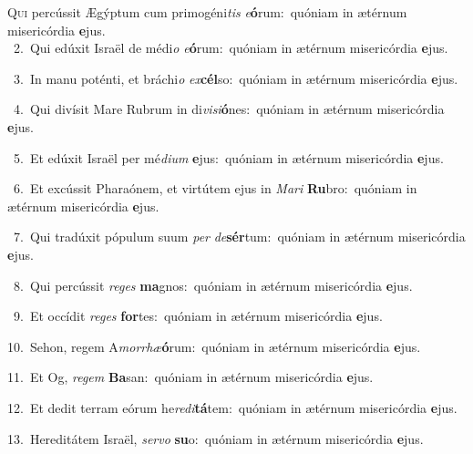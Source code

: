 \lettrine{\initial\textcolor{\initialcolor}{Q}}{ui} percússit Ægýptum cum primogéni\textit{tis} \textit{e}\-\textbf{ó}rum:~\star quóniam in ætérnum misericórdia \textbf{e}\-jus.\\
{\numbfont\textcolor{\numbcolor}{~2.}}~Qui edúxit Israël de médi\textit{o} \textit{e}\-\textbf{ó}rum:~\star quóniam in ætérnum misericórdia \textbf{e}\-jus.\par
{\numbfont\textcolor{\numbcolor}{~3.}}~In manu poténti, et bráchi\textit{o} \textit{ex}\-\textbf{cél}so:~\star quóniam in ætérnum misericórdia \textbf{e}\-jus.\par
{\numbfont\textcolor{\numbcolor}{~4.}}~Qui divísit Mare Rubrum in di\-\textit{vi}\-\textit{si}\textbf{ó}nes:~\star quóniam in ætérnum misericórdia \textbf{e}\-jus.\par
{\numbfont\textcolor{\numbcolor}{~5.}}~Et edúxit Israël per mé\-\textit{di}\-\textit{um} \textbf{e}\-jus:~\star quóniam in ætérnum misericórdia \textbf{e}\-jus.\par
{\numbfont\textcolor{\numbcolor}{~6.}}~Et excússit Pharaónem, et virtútem ejus in \textit{Ma}\-\textit{ri} \textbf{Ru}\-bro:~\star quóniam in ætérnum misericórdia \textbf{e}\-jus.\par
{\numbfont\textcolor{\numbcolor}{~7.}}~Qui tradúxit pópulum suum \textit{per} \textit{de}\-\textbf{sér}tum:~\star quóniam in ætérnum misericórdia \textbf{e}\-jus.\par
{\numbfont\textcolor{\numbcolor}{~8.}}~Qui percússit \textit{re}\-\textit{ges} \textbf{ma}\-gnos:~\star quóniam in ætérnum misericórdia \textbf{e}\-jus.\par
{\numbfont\textcolor{\numbcolor}{~9.}}~Et occídit \textit{re}\-\textit{ges} \textbf{for}\-tes:~\star quóniam in ætérnum misericórdia \textbf{e}\-jus.\par
{\numbfont\textcolor{\numbcolor}{10.}}~Sehon, regem A\-\textit{mor}\-\textit{rhæ}\textbf{ó}rum:~\star quóniam in ætérnum misericórdia \textbf{e}\-jus.\par
{\numbfont\textcolor{\numbcolor}{11.}}~Et Og, \textit{re}\-\textit{gem} \textbf{Ba}\-san:~\star quóniam in ætérnum misericórdia \textbf{e}\-jus.\par
{\numbfont\textcolor{\numbcolor}{12.}}~Et dedit terram eórum he\-\textit{re}\-\textit{di}\textbf{tá}tem:~\star quóniam in ætérnum misericórdia \textbf{e}\-jus.\par
{\numbfont\textcolor{\numbcolor}{13.}}~Hereditátem Israël, \textit{ser}\-\textit{vo} \textbf{su}\-o:~\star quóniam in ætérnum misericórdia \textbf{e}\-jus.\par
